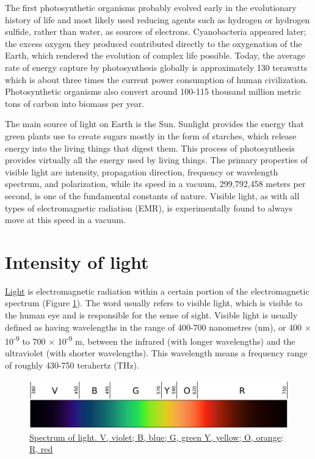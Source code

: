 The first photosynthetic organisms probably evolved early in the
evolutionary history of life and most likely used reducing agents such
as hydrogen or hydrogen sulfide, rather than water, as sources of
electrons. Cyanobacteria appeared later; the excess oxygen they produced
contributed directly to the oxygenation of the Earth, which rendered the
evolution of complex life possible. Today, the average rate of energy
capture by photosynthesis globally is approximately 130 terawatts which
is about three times the current power consumption of human
civilization. Photosynthetic organisms also convert around 100-115
thousand million metric tons of carbon into biomass per year.

The main source of light on Earth is the Sun. Sunlight provides the
energy that green plants use to create sugars mostly in the form of
starches, which release energy into the living things that digest them.
This process of photosynthesis provides virtually all the energy used by
living things. The primary properties of visible light are intensity,
propagation direction, frequency or wavelength spectrum, and
polarization, while its speed in a vacuum, 299,792,458 meters per
second, is one of the fundamental constants of nature. Visible light, as
with all types of electromagnetic radiation (EMR), is experimentally
found to always move at this speed in a vacuum.

\section{Intensity of light}\label{intensity-of-light}

\href{https://en.wikipedia.org/wiki/Light}{Light} is electromagnetic
radiation within a certain portion of the electromagnetic spectrum
(Figure \ref{fig:spectrum}). The word usually refers to visible light,
which is visible to the human eye and is responsible for the sense of
sight. Visible light is usually defined as having wavelengths in the
range of 400-700 nanometres (nm), or 400 × 10\textsuperscript{-9} to 700
× 10\textsuperscript{-9} m, between the infrared (with longer
wavelengths) and the ultraviolet (with shorter wavelengths). This
wavelength means a frequency range of roughly 430-750 terahertz (THz).

\begin{figure}

{\centering \includegraphics[width=0.7\linewidth]{./figures/photosynthesis/spectrum}

}

\caption{\href{https://commons.wikimedia.org/wiki/File:Linear_visible_spectrum.svg}{Spectrum
of light. V, violet; B, blue; G, green Y, yellow; O, orange; R, red}}\label{fig:spectrum}
\end{figure}

